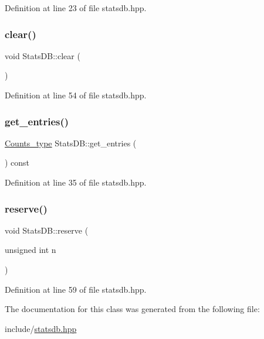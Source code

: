 Definition at line 23 of file statsdb.\+hpp.

\mbox{\label{class_stats_d_b_a5de68def55b0a3b99a8f609815624a00}} 
\subsubsection{\texorpdfstring{clear()}{clear()}}
{\footnotesize\ttfamily void Stats\+D\+B\+::clear (\begin{DoxyParamCaption}{ }\end{DoxyParamCaption})\hspace{0.3cm}{\ttfamily [inline]}}



Definition at line 54 of file statsdb.\+hpp.

\mbox{\label{class_stats_d_b_a8ed62f6a3939b90b3493de944c9b67fc}} 
\subsubsection{\texorpdfstring{get\+\_\+entries()}{get\_entries()}}
{\footnotesize\ttfamily \hyperlink{typedefs_8hpp_aee40fa17c1fddb63dd1f2b1470ade95b}{Counts\+\_\+type} Stats\+D\+B\+::get\+\_\+entries (\begin{DoxyParamCaption}{ }\end{DoxyParamCaption}) const\hspace{0.3cm}{\ttfamily [inline]}}



Definition at line 35 of file statsdb.\+hpp.

\mbox{\label{class_stats_d_b_a3370b7f2fb16aa047f8a938232a98602}} 
\subsubsection{\texorpdfstring{reserve()}{reserve()}}
{\footnotesize\ttfamily void Stats\+D\+B\+::reserve (\begin{DoxyParamCaption}\item[{unsigned int}]{n }\end{DoxyParamCaption})\hspace{0.3cm}{\ttfamily [inline]}}



Definition at line 59 of file statsdb.\+hpp.



The documentation for this class was generated from the following file\+:\begin{DoxyCompactItemize}
\item 
include/\hyperlink{statsdb_8hpp}{statsdb.\+hpp}\end{DoxyCompactItemize}
